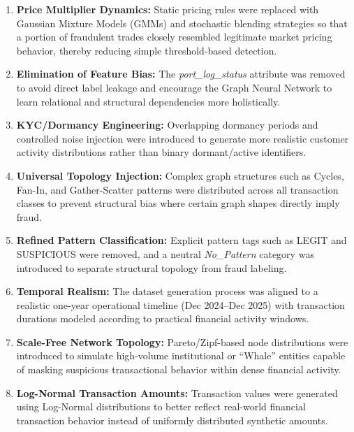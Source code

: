 \begin{enumerate}

    \item \textbf{Price Multiplier Dynamics:} Static pricing rules were replaced with Gaussian Mixture Models (GMMs) and stochastic blending strategies so that a portion of fraudulent trades closely resembled legitimate market pricing behavior, thereby reducing simple threshold-based detection.

    \item \textbf{Elimination of Feature Bias:} The \textit{port\_log\_status} attribute was removed to avoid direct label leakage and encourage the Graph Neural Network to learn relational and structural dependencies more holistically.

    \item \textbf{KYC/Dormancy Engineering:} Overlapping dormancy periods and controlled noise injection were introduced to generate more realistic customer activity distributions rather than binary dormant/active identifiers.

    \item \textbf{Universal Topology Injection:} Complex graph structures such as Cycles, Fan-In, and Gather-Scatter patterns were distributed across all transaction classes to prevent structural bias where certain graph shapes directly imply fraud.

    \item \textbf{Refined Pattern Classification:} Explicit pattern tags such as LEGIT and SUSPICIOUS were removed, and a neutral \textit{No\_Pattern} category was introduced to separate structural topology from fraud labeling.

    \item \textbf{Temporal Realism:} The dataset generation process was aligned to a realistic one-year operational timeline (Dec 2024--Dec 2025) with transaction durations modeled according to practical financial activity windows.

    \item \textbf{Scale-Free Network Topology:} Pareto/Zipf-based node distributions were introduced to simulate high-volume institutional or ``Whale'' entities capable of masking suspicious transactional behavior within dense financial activity.

    \item \textbf{Log-Normal Transaction Amounts:} Transaction values were generated using Log-Normal distributions to better reflect real-world financial transaction behavior instead of uniformly distributed synthetic amounts.


\end{enumerate}
